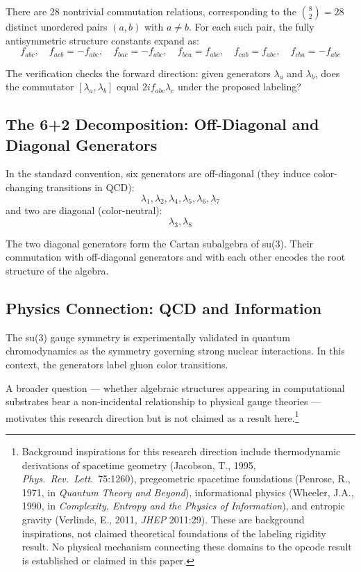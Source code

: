 \documentclass[11pt,a4paper]{article}
\begin{document}
There are 28 nontrivial commutation relations, corresponding to the $\binom{8}{2} = 28$ distinct unordered pairs $(a, b)$ with $a \neq b$. For each such pair, the fully antisymmetric structure constants expand as:
\begin{equation}
f_{abc}, \quad f_{acb} = -f_{abc}, \quad f_{bac} = -f_{abc}, \quad f_{bca} = f_{abc}, \quad f_{cab} = f_{abc}, \quad f_{cba} = -f_{abc}
\end{equation}

The verification checks the forward direction: given generators $\lambda_a$ and $\lambda_b$, does the commutator $[\lambda_a, \lambda_b]$ equal $2i f_{abc} \lambda_c$ under the proposed labeling?

\subsection{The 6+2 Decomposition: Off-Diagonal and Diagonal Generators}

In the standard convention, six generators are off-diagonal (they induce color-changing transitions in QCD):
$$\lambda_1, \lambda_2, \lambda_4, \lambda_5, \lambda_6, \lambda_7$$
and two are diagonal (color-neutral):
$$\lambda_3, \lambda_8$$

The two diagonal generators form the Cartan subalgebra of su(3). Their commutation with off-diagonal generators and with each other encodes the root structure of the algebra.

\subsection{Physics Connection: QCD and Information}

The su(3) gauge symmetry is experimentally validated in quantum chromodynamics as the symmetry governing strong nuclear interactions. In this context, the generators label gluon color transitions.

A broader question --- whether algebraic structures appearing in computational substrates bear a non-incidental relationship to physical gauge theories --- motivates this research direction but is not claimed as a result here.\footnote{Background inspirations for this research direction include thermodynamic derivations of spacetime geometry (Jacobson, T., 1995, \textit{Phys.\ Rev.\ Lett.}\ 75:1260), pregeometric spacetime foundations (Penrose, R., 1971, in \textit{Quantum Theory and Beyond}), informational physics (Wheeler, J.A., 1990, in \textit{Complexity, Entropy and the Physics of Information}), and entropic gravity (Verlinde, E., 2011, \textit{JHEP} 2011:29). These are background inspirations, not claimed theoretical foundations of the labeling rigidity result. No physical mechanism connecting these domains to the opcode result is established or claimed in this paper.}
\end{document}
